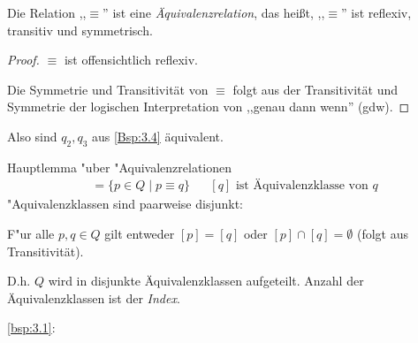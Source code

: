 \begin{lemma}[name={[$\equiv$ ist Äquivalenzrelation]}] %
        Die Relation ,,$\equiv$'' ist eine \emph{Äquivalenzrelation}, das heißt, ,,$\equiv$'' ist reflexiv, transitiv und symmetrisch.
\end{lemma}
\begin{proof}

  $\equiv$ ist offensichtlich reflexiv.
        
  Die Symmetrie und Transitivität von $\equiv$ folgt aus der Transitivität und Symmetrie der logischen Interpretation von ,,genau dann wenn'' (gdw).
\end{proof}
Also sind $q_2,q_3$ aus \autoref{Bsp:3.4} äquivalent.
\begin{Erinnerung}
Hauptlemma "uber "Aquivalenzrelationen
\begin{align*}
        [q] &= \{p\in Q \mid p \equiv q\} &&[q] \text{ ist Äquivalenzklasse von }q
\end{align*}
"Aquivalenzklassen sind paarweise disjunkt:

F"ur alle $ p,q\in Q$ gilt entweder $[p]=[q]$ oder $[p]\cap[q] = \emptyset$ (folgt aus Transitivität).

D.h. $Q$ wird in disjunkte Äquivalenzklassen aufgeteilt. Anzahl der Äquivalenzklassen ist der \emph{Index}.
\end{Erinnerung}

\eqref{bsp:3.1}:
\begin{minipage}{.5\textwidth}
    \captionsetup{type=figure}
\end{minipage}

